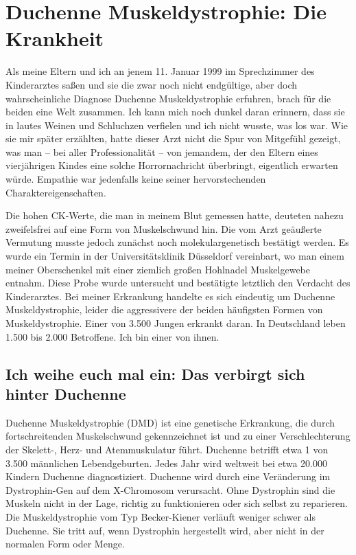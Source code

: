 \documentclass[fontsize=14pt,a4paper,headinclude,DIV=calc,automark]{scrbook}
\begin{document}
\thispagestyle{scrheadings} %

\leavevmode
\normalsize

\section{Duchenne Muskeldystrophie: Die Krankheit}

Als meine Eltern und ich an jenem 11. Januar 1999 im Sprechzimmer des Kinderarztes saßen und sie die zwar noch nicht endgültige, aber doch wahrscheinliche Diagnose Duchenne Muskeldystrophie erfuhren, brach für die beiden eine Welt zusammen. Ich kann mich noch dunkel daran erinnern, dass sie in lautes Weinen und Schluchzen verfielen und ich nicht wusste, was los war. Wie sie mir später erzählten, hatte dieser Arzt nicht die Spur von Mitgefühl gezeigt, was man – bei aller Professionalität – von jemandem, der den Eltern eines vierjährigen Kindes eine solche Horrornachricht überbringt, eigentlich erwarten würde. Empathie war jedenfalls keine seiner hervorstechenden Charaktereigenschaften.

Die hohen CK-Werte, die man in meinem Blut gemessen hatte, deuteten nahezu zweifelsfrei auf eine Form von Muskelschwund hin. Die vom Arzt geäußerte Vermutung musste jedoch zunächst noch molekulargenetisch bestätigt werden. Es wurde ein Termin in der Universitätsklinik Düsseldorf vereinbart, wo man einem meiner Oberschenkel mit einer ziemlich großen Hohlnadel Muskelgewebe entnahm. Diese Probe wurde untersucht und bestätigte letztlich den Verdacht des Kinderarztes. Bei meiner Erkrankung handelte es sich eindeutig um Duchenne Muskeldystrophie, leider die aggressivere der beiden häufigsten Formen von Muskeldystrophie. Einer von 3.500 Jungen erkrankt daran. In Deutschland leben 1.500 bis 2.000 Betroffene. Ich bin einer von ihnen.

\subsection{Ich weihe euch mal ein: Das verbirgt sich hinter Duchenne}

Duchenne Muskeldystrophie (DMD) ist eine genetische Erkrankung, die durch fortschreitenden Muskelschwund gekennzeichnet ist und zu einer Verschlechterung der Skelett-, Herz- und Atemmuskulatur führt. Duchenne betrifft etwa 1 von 3.500 männlichen Lebendgeburten. Jedes Jahr wird weltweit bei etwa 20.000 Kindern Duchenne diagnostiziert. Duchenne wird durch eine Veränderung im Dystrophin-Gen auf dem X-Chromosom verursacht. Ohne Dystrophin sind die Muskeln nicht in der Lage, richtig zu funktionieren oder sich selbst zu reparieren. Die Muskeldystrophie vom Typ Becker-Kiener verläuft weniger schwer als Duchenne. Sie tritt auf, wenn Dystrophin hergestellt wird, aber nicht in der normalen Form oder Menge.
\end{document}
